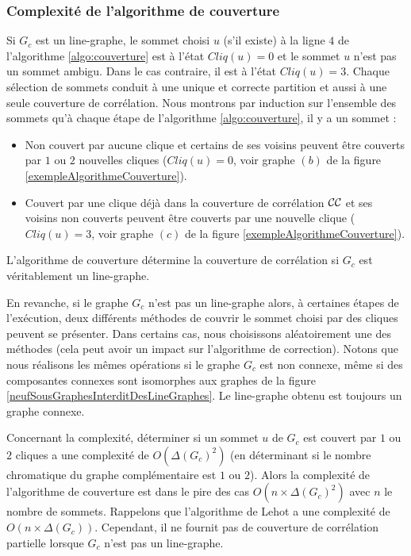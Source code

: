 \subsubsection{Complexit\'e de l'algorithme de couverture}

Si $G_c$ est un line-graphe, le sommet choisi $u$ (s'il existe) \`a la ligne $4$ de l'algorithme \ref{algo:couverture}  est \`a l'\'etat $Cliq(u) = 0$ et le sommet $u$ n'est pas un sommet ambigu. Dans le cas contraire, il est \`a l'\'etat $Cliq(u) = 3$.
Chaque s\'election de sommets conduit \`a  une unique et correcte partition et aussi \`a une seule couverture de corr\'elation. 
Nous montrons par induction sur l'ensemble des sommets qu'\`a chaque \'etape de l'algorithme \ref{algo:couverture}, il y a un sommet :
\begin{itemize}
	\item Non couvert par aucune clique et certains de ses voisins peuvent \^etre couverts par $1$ ou $2$ nouvelles cliques ($Cliq(u) = 0$, voir graphe $(b)$ de la figure \ref{exempleAlgorithmeCouverture}).
	\item Couvert par une clique d\'ej\`a dans la couverture de corr\'elation ${\cal CC}$ et ses voisins non couverts peuvent \^etre couverts par une nouvelle clique  ($Cliq(u) = 3$, voir graphe $(c)$ de la figure \ref{exempleAlgorithmeCouverture}).
\end{itemize} 
L'algorithme de couverture d\'etermine la couverture de corr\'elation si $G_c$ est v\'eritablement un line-graphe.

En revanche, si le graphe $G_c$ n'est pas un line-graphe alors, \`a certaines \'etapes de l'ex\'ecution, deux diff\'erents m\'ethodes de couvrir le sommet choisi par des cliques peuvent se pr\'esenter. Dans certains cas, nous choisissons al\'eatoirement  une des m\'ethodes (cela peut avoir un impact sur l'algorithme de correction). 
Notons que nous r\'ealisons les m\^emes op\'erations si le graphe $G_c$ est non connexe, m\^eme si des composantes connexes sont isomorphes aux graphes de la figure  \ref{neufSousGraphesInterditDesLineGraphes}. 
Le line-graphe obtenu est toujours un graphe connexe.
\newline

Concernant la complexit\'e, d\'eterminer si un sommet $u$ de $G_c$ est couvert par $1$ ou $2$ cliques a une complexit\'e de $O(\Delta(G_c)^2)$ (en d\'eterminant si le nombre chromatique du graphe compl\'ementaire est $1$ ou $2$). 
Alors la complexit\'e de l'algorithme de couverture est dans le pire des cas $O(n \times \Delta(G_c)^2)$ avec $n$ le nombre de sommets.  
Rappelons que l'algorithme de Lehot \cite{decompositionEnCliquesParArcs} a une complexit\'e de $O(n \times \Delta(G_c))$. Cependant, il ne fournit pas de couverture de corr\'elation partielle lorsque  $G_c$ n'est pas un line-graphe.
\newline

